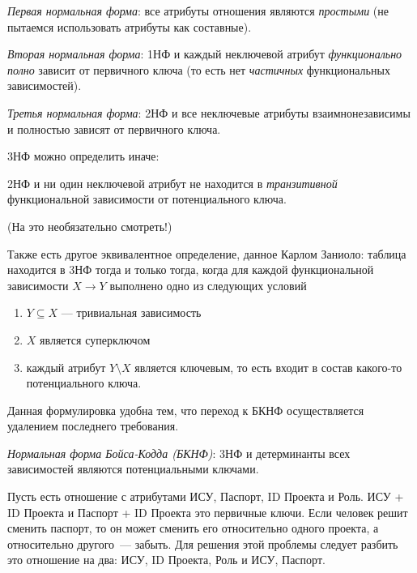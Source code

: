 \begin{definition}[1НФ]
  \textit{Первая нормальная форма}: все атрибуты отношения являются \textit{простыми} 
  (не пытаемся использовать атрибуты как составные).
\end{definition}

\begin{definition}[2НФ]
  \textit{Вторая нормальная форма}: 1НФ и каждый неключевой атрибут 
  \textit{функционально полно} зависит от первичного ключа
  (то есть нет \textit{частичных} функциональных зависимостей).
\end{definition}

\begin{definition}[3НФ]
  \textit{Третья нормальная форма}: 2НФ и все неключевые атрибуты взаимнонезависимы и
  полностью зависят от первичного ключа.
\end{definition}

3НФ можно определить иначе:
\begin{definition}[3НФ]
  2НФ и ни один неключевой атрибут не находится в \textit{транзитивной} функциональной
  зависимости от потенциального ключа.
\end{definition}

\begin{remark}
  (На это необязательно смотреть!)

  Также есть другое эквивалентное определение, данное Карлом Заниоло:
  таблица находится в 3НФ тогда и только тогда, когда для каждой функциональной зависимости
  \(X \to Y\) выполнено одно из следующих условий
  \begin{enumerate}
    \item \(Y \subseteq X\) --- тривиальная зависимость
    \item \(X\) является суперключом
    \item каждый атрибут \(Y \setminus X\) является ключевым,
    то есть входит в состав какого-то потенциального ключа.
  \end{enumerate}

  Данная формулировка удобна тем, что переход к БКНФ осуществляется удалением последнего требования.
\end{remark}

\begin{definition}[БКНФ]
  \textit{Нормальная форма Бойса-Кодда (БКНФ)}: 3НФ и детерминанты всех зависимостей
  являются потенциальными ключами.
\end{definition}

\begin{example}
  Пусть есть отношение с атрибутами ИСУ, Паспорт, ID Проекта и Роль. ИСУ +
   ID Проекта и Паспорт + ID Проекта это первичные ключи. Если человек решит
   сменить паспорт, то он может сменить его относительно одного проекта, а
   относительно другого~--- забыть. Для решения этой проблемы следует разбить
   это отношение на два: ИСУ, ID Проекта, Роль и ИСУ, Паспорт.
\end{example}


